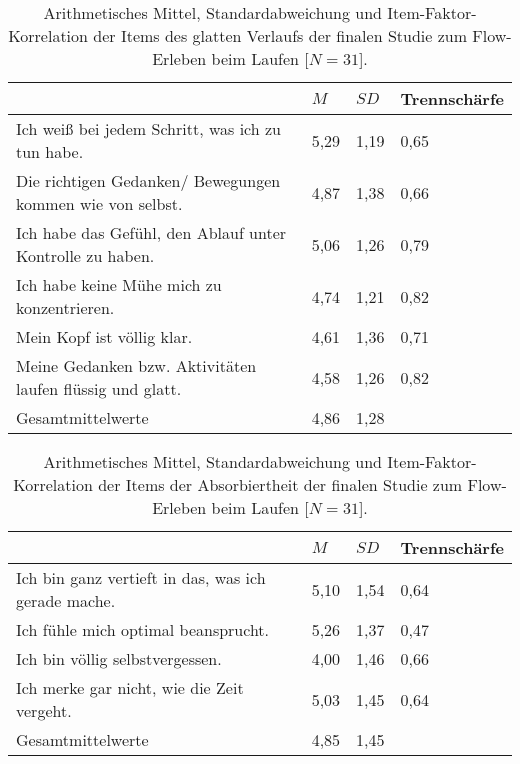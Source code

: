 \begin{table}
	[!htb] \centering \caption[Item-Faktor-Korrelation der Items des glatten Verlaufs (Finale Studie: Laufen)]{Arithmetisches Mittel, Standardabweichung und Item-Faktor-Korrelation der Items des glatten Verlaufs der finalen Studie zum Flow-Erleben beim Laufen [$N = 31$].} \label{tab:glatter_verlauf_3} 
	\begin{tabularx}
		{ 
		\textwidth}{p{} p{} p{} p{}} \toprule & $M$ & $SD$ & Trennschärfe \\
		\midrule Ich weiß bei jedem Schritt, was ich zu tun habe. & 5,29 & 1,19 & 0,65 \\
		Die richtigen Gedanken/ Bewegungen kommen wie von selbst. & 4,87 & 1,38 & 0,66 \\
		Ich habe das Gefühl, den Ablauf unter Kontrolle zu haben. & 5,06 & 1,26 & 0,79 \\
		Ich habe keine Mühe mich zu konzentrieren. & 4,74 & 1,21 & 0,82 \\
		Mein Kopf ist völlig klar. & 4,61 & 1,36 & 0,71 \\
		Meine Gedanken bzw. Aktivitäten laufen flüssig und glatt. & 4,58 & 1,26 & 0,82 \\
		Gesamtmittelwerte & 4,86 & 1,28 & \\
		\bottomrule 
	\end{tabularx}
\end{table}
\begin{table}
	[!htb] \centering \caption[Item-Faktor-Korrelation der Items der Absorbiertheit (Finale Studie: Laufen)]{Arithmetisches Mittel, Standardabweichung und Item-Faktor-Korrelation der Items der Absorbiertheit der finalen Studie zum Flow-Erleben beim Laufen [$N = 31$].} \label{tab:absorbiertheit_3} 
	\begin{tabularx}
		{ 
		\textwidth}{p{} p{} p{} p{}} \toprule & $M$ & $SD$ & Trennschärfe \\
		\midrule Ich bin ganz vertieft in das, was ich gerade mache. & 5,10 & 1,54 & 0,64 \\
		Ich fühle mich optimal beansprucht. & 5,26 & 1,37 & 0,47 \\
		Ich bin völlig selbstvergessen. & 4,00 & 1,46 & 0,66 \\
		Ich merke gar nicht, wie die Zeit vergeht. & 5,03 & 1,45 & 0,64 \\
		Gesamtmittelwerte & 4,85 & 1,45 & \\
		\bottomrule 
	\end{tabularx}
\end{table}

